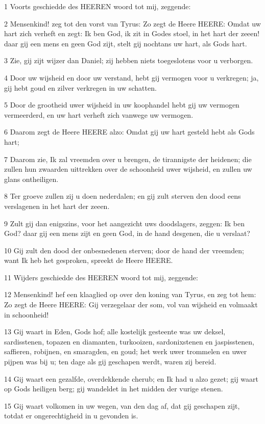 \par 1 Voorts geschiedde des HEEREN woord tot mij, zeggende:
\par 2 Mensenkind! zeg tot den vorst van Tyrus: Zo zegt de Heere HEERE: Omdat uw hart zich verheft en zegt: Ik ben God, ik zit in Godes stoel, in het hart der zeeen! daar gij een mens en geen God zijt, stelt gij nochtans uw hart, als Gods hart.
\par 3 Zie, gij zijt wijzer dan Daniel; zij hebben niets toegeslotens voor u verborgen.
\par 4 Door uw wijsheid en door uw verstand, hebt gij vermogen voor u verkregen; ja, gij hebt goud en zilver verkregen in uw schatten.
\par 5 Door de grootheid uwer wijsheid in uw koophandel hebt gij uw vermogen vermeerderd, en uw hart verheft zich vanwege uw vermogen.
\par 6 Daarom zegt de Heere HEERE alzo: Omdat gij uw hart gesteld hebt als Gods hart;
\par 7 Daarom zie, Ik zal vreemden over u brengen, de tirannigste der heidenen; die zullen hun zwaarden uittrekken over de schoonheid uwer wijsheid, en zullen uw glans ontheiligen.
\par 8 Ter groeve zullen zij u doen nederdalen; en gij zult sterven den dood eens verslagenen in het hart der zeeen.
\par 9 Zult gij dan enigszins, voor het aangezicht uws doodslagers, zeggen: Ik ben God? daar gij een mens zijt en geen God, in de hand desgenen, die u verslaat?
\par 10 Gij zult den dood der onbesnedenen sterven; door de hand der vreemden; want Ik heb het gesproken, spreekt de Heere HEERE.
\par 11 Wijders geschiedde des HEEREN woord tot mij, zeggende:
\par 12 Mensenkind! hef een klaaglied op over den koning van Tyrus, en zeg tot hem: Zo zegt de Heere HEERE: Gij verzegelaar der som, vol van wijsheid en volmaakt in schoonheid!
\par 13 Gij waart in Eden, Gods hof; alle kostelijk gesteente was uw deksel, sardisstenen, topazen en diamanten, turkooizen, sardonixstenen en jaspisstenen, saffieren, robijnen, en smaragden, en goud; het werk uwer trommelen en uwer pijpen was bij u; ten dage als gij geschapen werdt, waren zij bereid.
\par 14 Gij waart een gezalfde, overdekkende cherub; en Ik had u alzo gezet; gij waart op Gods heiligen berg; gij wandeldet in het midden der vurige stenen.
\par 15 Gij waart volkomen in uw wegen, van den dag af, dat gij geschapen zijt, totdat er ongerechtigheid in u gevonden is.
